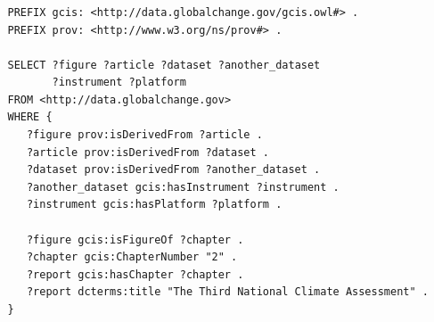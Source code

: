 \documentclass{beamer}
\begin{document}


\begin{frame}[fragile]
    \frametitle{\insertsubsectionhead}
\begin{small}
\begin{Verbatim}
   PREFIX gcis: <http://data.globalchange.gov/gcis.owl#> .
   PREFIX prov: <http://www.w3.org/ns/prov#> .

   SELECT ?figure ?article ?dataset ?another_dataset
          ?instrument ?platform
   FROM <http://data.globalchange.gov>
   WHERE {
      ?figure prov:isDerivedFrom ?article .
      ?article prov:isDerivedFrom ?dataset .
      ?dataset prov:isDerivedFrom ?another_dataset .
      ?another_dataset gcis:hasInstrument ?instrument .
      ?instrument gcis:hasPlatform ?platform .

      ?figure gcis:isFigureOf ?chapter .
      ?chapter gcis:ChapterNumber "2" .
      ?report gcis:hasChapter ?chapter .
      ?report dcterms:title "The Third National Climate Assessment" .
   }
\end{Verbatim}
\end{small}
\end{frame}

\end{document}
